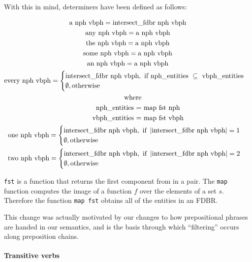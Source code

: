 \documentclass[../main.tex]{subfiles}
\begin{document}
With this in mind, determiners have been defined as follows:

\begin{gather*}
\text{a nph vbph} = \text{intersect\_fdbr nph vbph} \\
\text{any nph vbph} = \text{a nph vbph}   \\
\text{the nph vbph} = \text{a nph vbph}  \\
\text{some nph vbph} = \text{a nph vbph}   \\
\text{an nph vbph} = \text{a nph vbph}   \\
\text{every nph vbph} =
\begin{cases}
	\text{intersect\_fdbr nph vbph}, \text{ if nph\_entities } \subseteq \text{ vbph\_entities} \\
	\emptyset, \text{otherwise}
\end{cases} \\
\text{\indent where} \\
\text{\indent\indent nph\_entities = map fst nph} \\
\text{\indent\indent vbph\_entities = map fst vbph} \\
\text{one nph vbph} =
\begin{cases}
	\text{intersect\_fdbr nph vbph}, \text{ if } \left\vert\text{intersect\_fdbr nph vbph}\right\vert = 1 \\
	\emptyset, \text{otherwise}
\end{cases} \\
\text{two nph vbph} =
\begin{cases}
\text{intersect\_fdbr nph vbph}, \text{ if }\left\vert\text{intersect\_fdbr nph vbph}\right\vert = 2 \\
\emptyset, \text{otherwise}
\end{cases}
\end{gather*}

\texttt{fst} is a function that returns the first component from in a pair.  The \texttt{map} function computes the image of a function $f$ over the elements of a set $s$.  
Therefore the function \texttt{map fst} obtains all of the entities in an FDBR.

This change was actually motivated by our changes to how prepositional phrases are handed in our semantics, and is the basis through which
``filtering'' occurs along preposition chains.

\paragraph{Transitive verbs}
\end{document}
